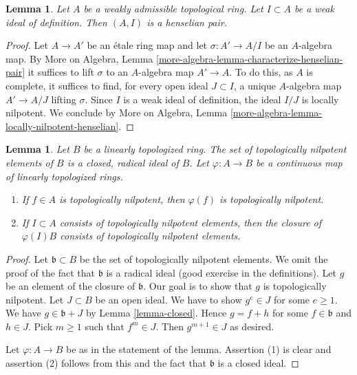 \documentclass{stacks-project}
\theoremstyle{plain}
\newtheorem{lemma}[subsection]{Lemma}
\theoremstyle{definition}
\theoremstyle{remark}
\numberwithin{equation}{subsection}
\begin{document}
\begin{lemma}
\label{lemma-weakly-admissible-henselian}
Let $A$ be a weakly admissible topological ring. Let $I \subset A$
be a weak ideal of definition. Then $(A, I)$ is a henselian pair.
\end{lemma}

\begin{proof}
Let $A \to A'$ be an \'etale ring map and let $\sigma : A' \to A/I$
be an $A$-algebra map. By More on Algebra, Lemma
\ref{more-algebra-lemma-characterize-henselian-pair} it suffices
to lift $\sigma$ to an $A$-algebra map $A' \to A$.
To do this, as $A$ is complete, it suffices to find,
for every open ideal $J \subset I$, a unique $A$-algebra map $A' \to A/J$
lifting $\sigma$. Since $I$ is a weak ideal of definition,
the ideal $I/J$ is locally nilpotent. We conclude by
More on Algebra, Lemma \ref{more-algebra-lemma-locally-nilpotent-henselian}.
\end{proof}

\begin{lemma}
\label{lemma-topologically-nilpotent}
Let $B$ be a linearly topologized ring. The set of topologically nilpotent
elements of $B$ is a closed, radical ideal of $B$.
Let $\varphi : A \to B$ be a continuous map of linearly topologized rings.
\begin{enumerate}
\item If $f \in A$ is topologically nilpotent, then $\varphi(f)$ is
topologically nilpotent.
\item If $I \subset A$ consists of topologically nilpotent elements,
then the closure of $\varphi(I)B$ consists of topologically nilpotent
elements.
\end{enumerate}
\end{lemma}

\begin{proof}
Let $\mathfrak b \subset B$ be the set of topologically nilpotent elements.
We omit the proof of the fact that $\mathfrak b$ is a radical ideal
(good exercise in the definitions). Let $g$ be an element of the closure
of $\mathfrak b$. Our goal is to show that $g$ is topologically nilpotent.
Let $J \subset B$ be an open ideal. We have to show
$g^e \in J$ for some $e \geq 1$. We have $g \in \mathfrak b + J$
by Lemma \ref{lemma-closed}. Hence $g = f + h$
for some $f \in \mathfrak b$ and $h \in J$. Pick $m \geq 1$ such that
$f^m \in J$. Then $g^{m + 1} \in J$ as desired.

\medskip\noindent
Let $\varphi : A \to B$ be as in the statement of the lemma.
Assertion (1) is clear and assertion (2) follows from this and
the fact that $\mathfrak b$ is a closed ideal.
\end{proof}
\end{document}
